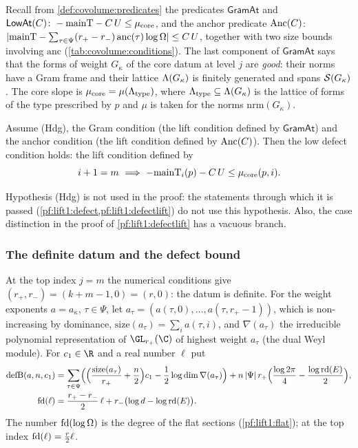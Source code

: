 Recall from \cref{def:covolume:predicates} the predicates $\mathsf{GramAt}$ and
$\mathsf{LowAt}(C)\colon-\mathrm{mainT}-C\,U\le\mu_{\mathrm{core}}$, and the anchor predicate
$\mathrm{Anc}(C)$: $|\mathrm{mainT}-\sum_{\tau\in\Psi}(r_+-r_-)\,\mathrm{anc}(\tau)\log\Omega|\le
C\,U$, together with two size bounds involving $\mathrm{anc}$ (\cref{tab:covolume:conditions}). The
last component of $\mathsf{GramAt}$ says that the forms of weight $G_\kappa$ of the core datum at level
$j$ are \emph{good}: their norms have a Gram frame and their lattice $\Lambda(G_\kappa)$ is
finitely generated and spans $\mathcal S(G_\kappa)$. The core slope is
$\mu_{\mathrm{core}}=\mu(\Lambda_{\mathrm{type}})$, where
$\Lambda_{\mathrm{type}}\subseteq\Lambda(G_\kappa)$ is the lattice of forms of the type
prescribed by $p$ and $\mu$ is taken for the norms $\mathrm{nrm}(G_\kappa)$.

\begin{theorem}\label{pf:lift1:lowdef-thm}
Assume (Hdg), the Gram condition (the lift condition defined by
$\mathsf{GramAt}$) and the anchor condition (the lift condition defined by $\mathrm{Anc}(C)$).
Then the low defect condition holds: the lift condition defined by
\[
i+1=m\ \Longrightarrow\ -\liftonemainT_i(p)-C\,U\le\liftonemuc(p,i).
\]
\end{theorem}

\begin{remark}\label{pf:lift1:lowdef-rem}
Hypothesis (Hdg) is not used in the proof: the statements through which it is passed
(\cref{pf:lift1:defect,pf:lift1:defectlift}) do not use this hypothesis. Also, the case distinction in
the proof of \cref{pf:lift1:defectlift} has a vacuous branch.
\end{remark}

\subsubsection*{The definite datum and the defect bound}
At the top index $j=m$ the numerical conditions give $(r_+,r_-)=(k+m-1,0)=(r,0)$: the datum is definite.
For the weight exponents $a=a_\kappa$, $\tau\in\Psi$, let $a_\tau=(a(\tau,0),\dots,a(\tau,r_+-1))$,
which is non-increasing by dominance, $\mathrm{size}(a_\tau)=\sum_ia(\tau,i)$, and $\nabla(a_\tau)$ the
irreducible polynomial representation of $\GL_{r_+}(\C)$ of highest weight $a_\tau$ (the dual Weyl
module). For $c_1\in\R$ and a real number $\ell$ put
\begin{align}
\mathrm{defB}(a,n,c_1)&=\sum_{\tau\in\Psi}\Bigl(\Bigl(\frac{\mathrm{size}(a_\tau)}{r_+}+\frac n2\Bigr)c_1
-\frac12\log\dim\nabla(a_\tau)\Bigr)+n\,|\Psi|\,r_+\Bigl(\frac{\log2\pi}4-\frac{\log\mathrm{rd}(E)}2\Bigr),
\label{pf:lift1:eq:defB}\\
\mathrm{fd}(\ell)&=\frac{r_+-r_-}2\,\ell+r_-\bigl(\log d-\log\mathrm{rd}(E)\bigr).\label{pf:lift1:eq:fd}
\end{align}
The number $\mathrm{fd}(\log\Omega)$ is the degree of the flat sections (\cref{pf:lift1:flat}); at the
top index $\mathrm{fd}(\ell)=\frac r2\ell$.

